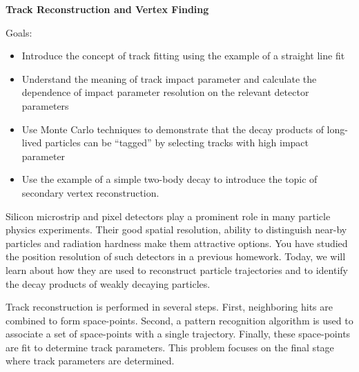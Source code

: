 \documentclass[12pt]{article}
\begin{document}
\begin{center}
  {\large\bf Track Reconstruction and Vertex Finding}
\end{center}
\vskip0.2in
Goals:
\begin{itemize}
\item Introduce the concept of track fitting using the example of a straight line
  fit
\item Understand the meaning of track impact parameter  and calculate the
  dependence of impact parameter resolution on the relevant detector parameters
\item Use Monte Carlo techniques to demonstrate that the decay products of
  long-lived particles can  be ``tagged'' by selecting tracks with high
  impact parameter
\item Use the example of a simple two-body decay to introduce the topic of
  secondary vertex reconstruction.
\end{itemize}
Silicon microstrip and pixel detectors play a prominent role in many particle
physics experiments.  Their good spatial resolution, ability to distinguish
near-by particles and radiation hardness make them attractive options.  You
have studied the position resolution of such detectors in a previous homework.
Today, we will learn about how they are used to reconstruct particle trajectories
and to identify the decay products of weakly decaying particles.

Track reconstruction is performed in several steps.  First, neighboring hits are
combined to form space-points.  Second, a pattern recognition
algorithm is used to associate a set of space-points with a single trajectory.
Finally, these space-points are fit to determine track parameters.  This problem
focuses on the final stage where track parameters are determined.
\end{document}

